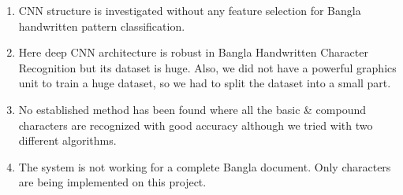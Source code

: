 \documentclass{article}
\begin{document}
\begin{enumerate}
\item CNN structure is investigated without any feature selection for Bangla handwritten pattern classification. 
\item Here deep CNN architecture is robust in Bangla Handwritten Character Recognition but its dataset is huge. Also, we did not have a powerful graphics unit to train a huge dataset, so we had to split the dataset into a small part.
\item No established method has been found where all the basic & compound characters are recognized with good accuracy although we tried with two different algorithms.
\item The system is not working for a complete Bangla document. Only characters are being implemented on this project.
\end{enumerate}
\end{document}
